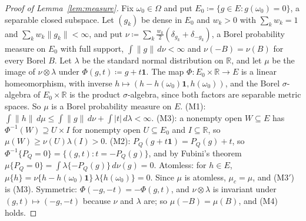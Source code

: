 \documentclass[11pt]{article}
\newcommand{\R}{\mathbb{R}}
\newcommand{\one}{\mathbf{1}}
\theoremstyle{plain}
\theoremstyle{definition}
\begin{document}
\begin{proof}[Proof of Lemma~\ref{lem:measure}]
Fix $\omega_0\in\Omega$ and put $E_0\coloneqq\{g\in E:g(\omega_0)=0\}$, a separable closed
subspace. Let $(g_k)$ be dense in $E_0$ and $w_k>0$ with $\sum_kw_k=1$ and $\sum_kw_k\|g_k\|<
\infty$, and put $\nu\coloneqq\sum_k\frac{w_k}2(\delta_{g_k}+\delta_{-g_k})$, a Borel
probability measure on $E_0$ with full support, $\int\|g\|\,d\nu<\infty$ and $\nu(-B)=\nu(B)$
for every Borel $B$. Let $\lambda$ be the standard normal distribution on
$\R$, and let $\mu$ be the image of $\nu\otimes\lambda$ under $\Phi(g,t)\coloneqq g+t\one$. The
map $\Phi:E_0\times\R\to E$ is a linear homeomorphism, with inverse $h\mapsto(h-h(\omega_0)
\one,h(\omega_0))$, and the Borel $\sigma$-algebra of $E_0\times\R$ is the product
$\sigma$-algebra, since both factors are separable metric spaces. So $\mu$ is a Borel
probability measure on $E$.
(M1): $\int\|h\|\,d\mu\le\int\|g\|\,d\nu+\int|t|\,d\lambda<\infty$.
(M3): a nonempty open $W\subseteq E$ has $\Phi^{-1}(W)\supseteq U\times I$ for nonempty open
$U\subseteq E_0$ and $I\subseteq\R$, so $\mu(W)\ge\nu(U)\lambda(I)>0$.
(M2): $P_Q(g+t\one)=P_Q(g)+t$, so $\Phi^{-1}\{P_Q=0\}=\{(g,t):t=-P_Q(g)\}$, and by Fubini's
theorem $\mu\{P_Q=0\}=\int\lambda\{-P_Q(g)\}\,d\nu(g)=0$.
Atomless: for $h\in E$, $\mu\{h\}=\nu\{h-h(\omega_0)\one\}\,\lambda\{h(\omega_0)\}=0$.
Since $\mu$ is atomless, $\mu_c=\mu$, and (M3$'$) is (M3).
Symmetric: $\Phi(-g,-t)=-\Phi(g,t)$, and $\nu\otimes\lambda$ is invariant under $(g,t)\mapsto
(-g,-t)$ because $\nu$ and $\lambda$ are; so $\mu(-B)=\mu(B)$, and (M4) holds.
\end{proof}
\end{document}
